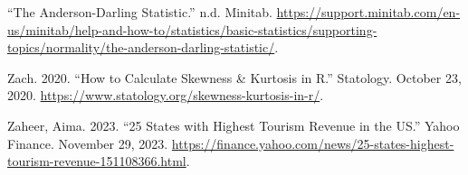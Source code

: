 \documentclass[11pt]{article}
\newenvironment{references}
  {\begin{list}{}{%
      \setlength{\leftmargin}{0.4in}%
      \setlength{\itemindent}{-0.4in}%
      \setlength{\itemsep}{0.6\baselineskip}%
      \setlength{\parsep}{0pt}%
  }}
  {\end{list}}
\begin{document}
\begin{references}
\item ``The Anderson-Darling Statistic.'' n.d. Minitab. \url{https://support.minitab.com/en-us/minitab/help-and-how-to/statistics/basic-statistics/supporting-topics/normality/the-anderson-darling-statistic/}.

\item Zach. 2020. ``How to Calculate Skewness \& Kurtosis in R.'' Statology. October 23, 2020. \url{https://www.statology.org/skewness-kurtosis-in-r/}.

\item Zaheer, Aima. 2023. ``25 States with Highest Tourism Revenue in the US.'' Yahoo Finance. November 29, 2023. \url{https://finance.yahoo.com/news/25-states-highest-tourism-revenue-151108366.html}.

\end{references}
\end{document}

